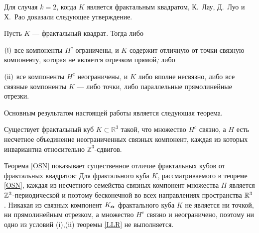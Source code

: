 Для случая $k=2$, когда $K$ является фрактальным квадратом, К.~Лау, Д.~Луо и Х.~Рао  доказали следующее утверждение.
\begin{theorem}\label{LLR}
Пусть $K$ --- фрактальный квадрат. Тогда  либо

$\rm (i)$ все компоненты $H^c$  ограничены, и $K$ содержит отличную от точки связную компоненту, которая не является отрезком прямой\emph{;} либо

$\rm (ii)$ все компоненты $H^c$  неограничены, и  $K$ либо вполне несвязно, либо все  связные компоненты $K$ --- либо точки, либо параллельные прямолинейные отрезки.
\end{theorem}

Основным результатом настоящей работы является следующая теорема.
\begin{theorem}\label{OSN}
Существует фрактальный куб  $K\subset \mathbb{R}^3$ такой, что множество $H^c$ связно, а $H$ есть несчетное объединение неограниченных связных компонент, каждая из которых инвариантна относительно $\mathbb{Z}^3$-сдвигов.
\end{theorem}

Теорема \ref{OSN} показывает существенное отличие фрактальных кубов от фрактальных квадратов:
Для фрактального куба $K$, рассматриваемого в теореме \ref{OSN}, каждая из несчетного семейства связных компонент множества $H$ является $\mathbb{Z}^3$-периодической и поэтому бесконечной во всех направлениях пространства $\mathbb{R}^3$. 
Никакая из связных компонент $K_{\bm{\alpha}}$ фрактального куба $K$ не является ни точкой, ни прямолинейным отрезком, а множество $H^c$ связно и неограничено, поэтому ни одно из условий (i),(ii) теоремы \ref{LLR} не выполняется.

